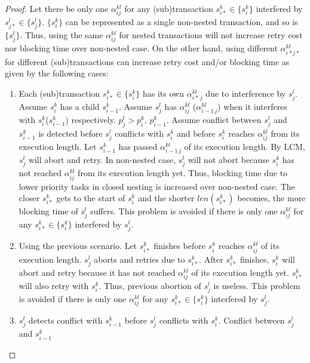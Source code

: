 \documentclass[10pt, conference, compsocconf]{IEEEtran}
\begin{document}
\begin{proof}

Let there be only one $\alpha_{ij}^{kl}$
for any (sub)transaction $s_{i*}^{k}\in\{s_{i}^{k}\}$ interfered
by $s_{j*}^{l}\in\{s_{j}^{l}\}$. $\{s_{i}^{k}\}$ can be represented
as a single non-nested transaction, and so is $\{s_{j}^{l}\}$. Thus,
using the same $\alpha_{ij}^{kl}$ for nested transactions will not
increase retry cost nor blocking time over non-nested case. On the
other hand, using different $\alpha_{i*j*}^{kl}$ for different (sub)transactions
can increase retry cost and/or blocking time as given by the following
cases:
\begin{enumerate}
\item Each (sub)transaction $s_{i*}^{k}\in\{s_{i}^{k}\}$ has its own $\alpha_{i*\, j}^{kl}$
due to interference by $s_{j}^{l}$. Assume $s_{i}^{k}$ has a child
$s_{i-1}^{k}$. Assume $s_{j}^{l}$ has $\alpha_{ij}^{kl}$ ($\alpha_{i-1\, j}^{kl}$)
when it interferes with $s_{i}^{k}$($s_{i-1}^{k}$) respectively.
$p_{j}^{l}>p_{i}^{k},\, p_{i-1}^{k}$. Assume conflict between $s_{j}^{l}$
and $s_{i-1}^{k}$ is detected before $s_{j}^{l}$ conflicts with
$s_{i}^{k}$ and before $s_{i}^{k}$ reaches $\alpha_{ij}^{kl}$ from
its execution length. Let $s_{i-1}^{k}$ has passed $\alpha_{i-1\, j}^{kl}$
of its execution length. By LCM, $s_{j}^{l}$ will abort and retry.
In non-nested case, $s_{j}^{l}$ will not abort because $s_{i}^{k}$
has not reached $\alpha_{ij}^{kl}$ from its execution length yet.
Thus, blocking time due to lower priority tasks in closed nesting
is increased over non-nested case. The closer $s_{i*}^{k}$ gets to
the start of $s_{i}^{k}$ and the shorter $len(s_{i*}^{k})$ becomes,
the more blocking time of $s_{j}^{l}$ suffers. This problem is avoided
if there is only one $\alpha_{ij}^{kl}$ for any $s_{i*}^{k}\in\{s_{i}^{k}\}$
interfered by $s_{j}^{l}$.
\item Using the previous scenario. Let $s_{i*}^{k}$ finishes before $s_{i}^{k}$
reaches $\alpha_{ij}^{kl}$ of its execution length. $s_{j}^{l}$
aborts and retries due to $s_{i*}^{k}$. After $s_{i*}^{k}$ finishes,
$s_{i}^{k}$ will abort and retry because it has not reached $\alpha_{ij}^{kl}$
of its execution length yet. $s_{i*}^{k}$ will also retry with $s_{i}^{k}$.
Thus, previous abortion of $s_{j}^{l}$ is useless. This problem is
avoided if there is only one $\alpha_{ij}^{kl}$ for any $s_{i*}^{k}\in\{s_{i}^{k}\}$
interfered by $s_{j}^{l}$.
\item $s_{j}^{l}$ detects conflict with $s_{i-1}^{k}$ before $s_{j}^{l}$
conflicts with $s_{i}^{k}$. Conflict between $s_{j}^{l}$ and $s_{i-1}^{k}$

\end{enumerate}
\end{proof}
\end{document}
